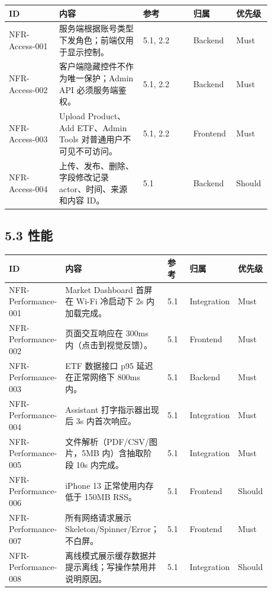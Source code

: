 \begingroup
\small
\begin{longtable}{L{0.18\linewidth}L{0.30\linewidth}L{0.18\linewidth}L{0.12\linewidth}L{0.10\linewidth}}
\toprule
\textbf{ID} & \textbf{内容} & \textbf{参考} & \textbf{归属} & \textbf{优先级} \\
\midrule
NFR-Access-001 & 服务端根据账号类型下发角色；前端仅用于显示控制。 & 5.1, 2.2 & Backend & Must \\
NFR-Access-002 & 客户端隐藏控件不作为唯一保护；Admin API 必须服务端鉴权。 & 5.1, 2.2 & Backend & Must \\
NFR-Access-003 & Upload Product、Add ETF、Admin Tools 对普通用户不可见不可访问。 & 5.1, 2.2 & Frontend & Must \\
NFR-Access-004 & 上传、发布、删除、字段修改记录 actor、时间、来源和内容 ID。 & 5.1 & Backend & Should \\
\bottomrule
\end{longtable}
\endgroup

\subsection{5.3 性能}

\begingroup
\small
\begin{longtable}{L{0.18\linewidth}L{0.30\linewidth}L{0.18\linewidth}L{0.12\linewidth}L{0.10\linewidth}}
\toprule
\textbf{ID} & \textbf{内容} & \textbf{参考} & \textbf{归属} & \textbf{优先级} \\
\midrule
NFR-Performance-001 & Market Dashboard 首屏在 Wi-Fi 冷启动下 2s 内加载完成。 & 5.1 & Integration & Must \\
NFR-Performance-002 & 页面交互响应在 300ms 内（点击到视觉反馈）。 & 5.1 & Frontend & Must \\
NFR-Performance-003 & ETF 数据接口 p95 延迟在正常网络下 800ms 内。 & 5.1 & Backend & Must \\
NFR-Performance-004 & Assistant 打字指示器出现后 3s 内首次响应。 & 5.1 & Integration & Must \\
NFR-Performance-005 & 文件解析（PDF/CSV/图片，5MB 内）含抽取阶段 10s 内完成。 & 5.1 & Integration & Must \\
NFR-Performance-006 & iPhone 13 正常使用内存低于 150MB RSS。 & 5.1 & Frontend & Should \\
NFR-Performance-007 & 所有网络请求展示 Skeleton/Spinner/Error；不白屏。 & 5.1 & Frontend & Must \\
NFR-Performance-008 & 离线模式展示缓存数据并提示离线；写操作禁用并说明原因。 & 5.1 & Integration & Should \\
\bottomrule
\end{longtable}
\endgroup

